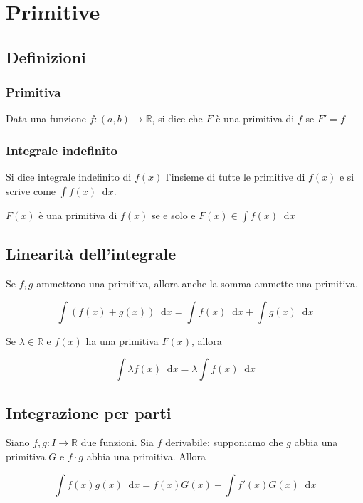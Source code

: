 \newcommand*\dif{\mathop{}\!\mathrm{d}}

\chapter{Primitive}

\section{Definizioni}

\subsection{Primitiva}

Data una funzione $f: (a,b) \to \mathbb{R}$, si dice che $F$ è una primitiva di $f$ se $F'=f$

\subsection{Integrale indefinito}

Si dice integrale indefinito di $f(x)$ l'insieme di tutte le primitive di $f(x)$ e si scrive come $\int f(x) \dif x$.

\begin{tip}
$F(x)$ è una primitiva di $f(x)$ se e solo e $F(x) \in \int f(x) \dif x$
\end{tip}

\section{Linearità dell'integrale}

Se $f,g$ ammettono una primitiva, allora anche la somma ammette una primitiva.

$$\int (f(x)+g(x)) \dif x = \int f(x)\dif x + \int g(x)\dif x$$

Se $\lambda \in \mathbb{R}$ e $f(x)$ ha una primitiva $F(x)$, allora

$$\int \lambda f(x) \dif x = \lambda \int f(x)\dif x$$

\section{Integrazione per parti}
Siano $f, g: I \to \mathbb{R}$ due funzioni. Sia $f$ derivabile; supponiamo che $g$ abbia una primitiva $G$ e $f \cdot g$ abbia una primitiva. Allora

$$\int f(x)g(x) \dif x = f(x)G(x) - \int f'(x) G(x) \dif x$$

